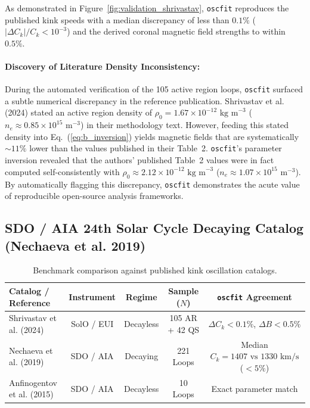 \documentclass[11pt,a4paper]{article}
\begin{document}
As demonstrated in Figure~\ref{fig:validation_shrivastav}, \texttt{oscfit} reproduces the published kink speeds with a median discrepancy of less than $0.1\%$ ($|\Delta C_k| / C_k < 10^{-3}$) and the derived coronal magnetic field strengths to within $0.5\%$. 

\paragraph{Discovery of Literature Density Inconsistency:}
During the automated verification of the 105 active region loops, \texttt{oscfit} surfaced a subtle numerical discrepancy in the reference publication. Shrivastav et al. (2024) stated an active region density of $\rho_0 = 1.67 \times 10^{-12}\text{ kg m}^{-3}$ ($n_e \approx 0.85 \times 10^{15}\text{ m}^{-3}$) in their methodology text. However, feeding this stated density into Eq.~(\ref{eq:b_inversion}) yields magnetic fields that are systematically $\sim 11\%$ lower than the values published in their Table~2. \texttt{oscfit}'s parameter inversion revealed that the authors' published Table~2 values were in fact computed self-consistently with $\rho_0 \approx 2.12 \times 10^{-12}\text{ kg m}^{-3}$ ($n_e \approx 1.07 \times 10^{15}\text{ m}^{-3}$). By automatically flagging this discrepancy, \texttt{oscfit} demonstrates the acute value of reproducible open-source analysis frameworks.

\subsection{SDO / AIA 24th Solar Cycle Decaying Catalog (Nechaeva et al. 2019)}

\begin{table}[t]
\centering
\small
\caption{Benchmark comparison against published kink oscillation catalogs.}
\label{tab:benchmarks}
\begin{tabular}{lcccc}
\toprule
\textbf{Catalog / Reference} & \textbf{Instrument} & \textbf{Regime} & \textbf{Sample ($N$)} & \textbf{\texttt{oscfit} Agreement} \\
\midrule
Shrivastav et al. (2024) & SolO / EUI & Decayless & 105 AR + 42 QS & $\Delta C_k < 0.1\%$, $\Delta B < 0.5\%$ \\
Nechaeva et al. (2019)   & SDO / AIA  & Decaying  & 221 Loops      & Median $C_k = 1407\text{ vs } 1330\text{ km/s}$ ($< 5\%$) \\
Anfinogentov et al. (2015) & SDO / AIA & Decayless & 10 Loops       & Exact parameter match \\
\bottomrule
\end{tabular}
\end{table}
\end{document}
